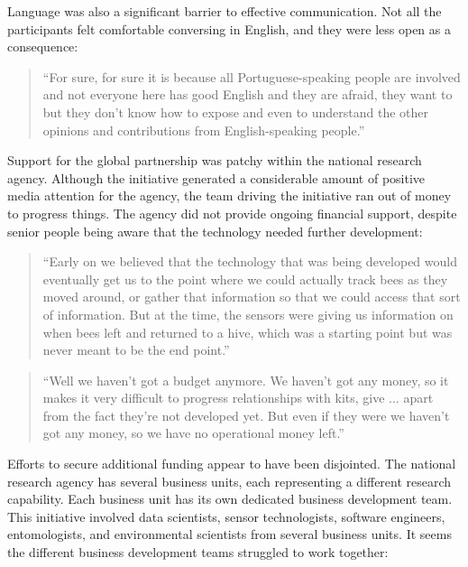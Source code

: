 Language was also a significant barrier to effective communication. Not all the participants felt comfortable conversing in English, and they were less open as a consequence:

\begin{quote}
\small
\enquote{For sure, for sure it is because all Portuguese-speaking people are involved and not everyone here has good English and they are afraid, they want to but they don't know how to expose and even to understand the other opinions and contributions from English-speaking people.} \\
\end{quote}

Support for the global partnership was patchy within the national research agency. Although the initiative generated a considerable amount of positive media attention for the agency, the team driving the initiative ran out of money to progress things. The agency did not provide ongoing financial support, despite senior people being aware that the technology needed further development:

\begin{quote}
\small
\enquote{Early on we believed that the technology that was being developed would eventually get us to the point where we could actually track bees as they moved around, or gather that information so that we could access that sort of information. But at the time, the sensors were giving us information on when bees left and returned to a hive, which was a starting point but was never meant to be the end point.} \\
\end{quote}

\begin{quote}
\small
\enquote{Well we haven't got a budget anymore.  We haven't got any money, so it makes it very difficult to progress relationships with kits, give ... apart from the fact they're not developed yet. But even if they were we haven't got any money, so we have no operational money left.} \\
\end{quote}

Efforts to secure additional funding appear to have been disjointed. The national research agency has several business units, each representing a different research capability. Each business unit has its own dedicated business development team. This initiative involved data scientists, sensor technologists, software engineers, entomologists, and environmental scientists from several business units. It seems the different business development teams struggled to work together:

